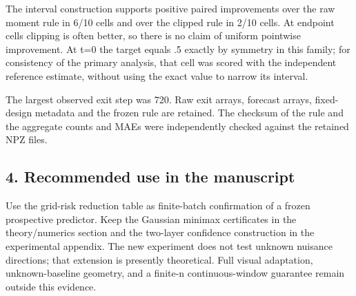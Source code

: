 The interval construction supports positive paired improvements over the
raw moment rule in 6/10 cells and over the clipped rule in 2/10 cells.
At endpoint cells clipping is often better, so there is no claim of
uniform pointwise improvement. At t=0 the target equals .5 exactly by
symmetry in this family; for consistency of the primary analysis, that
cell was scored with the independent reference estimate, without using
the exact value to narrow its interval.

The largest observed exit step was 720. Raw exit arrays, forecast
arrays, fixed-design metadata and the frozen rule are retained. The
checksum of the rule and the aggregate counts and MAEs were
independently checked against the retained NPZ files.

\subsection{4. Recommended use in the
manuscript}\label{confirmation-recommended-use-in-the-manuscript}

Use the grid-risk reduction table as finite-batch confirmation of a
frozen prospective predictor. Keep the Gaussian minimax certificates in
the theory/numerics section and the two-layer confidence construction in
the experimental appendix. The new experiment does not test unknown
nuisance directions; that extension is presently theoretical. Full
visual adaptation, unknown-baseline geometry, and a finite-n
continuous-window guarantee remain outside this evidence.
